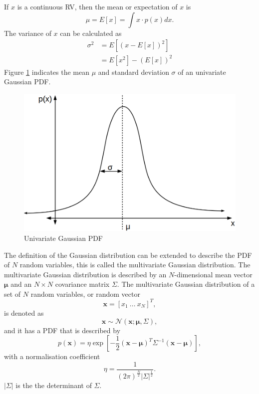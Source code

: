 \documentclass[12pt,oneside,openany,a4paper, %
afrikaans,english,
]{memoir}
\numberwithin{equation}{chapter}
\begin{document}
If $x$ is a continuous RV, then the mean or expectation of $x$ is
\begin{equation}
\mu = E\left[ x \right] = \int x \cdot p(x)dx.
\end{equation}
The variance of $x$ can be calculated as
\begin{equation}
\begin{split}
\sigma^2 & = E\left[\left(x - E[x]\right)^2\right]\\
& = E[x^2] - (E[x])^2
\end{split}
\end{equation}
 Figure \ref{fig:gPDF1} indicates the mean $\mu$ and standard deviation $\sigma$ of an univariate Gaussian PDF.
\begin{figure}[H]
  \includegraphics[width=0.6\linewidth]{Figures/univariate.png}
  \centering
  \caption{Univariate Gaussian PDF}
  \label{fig:gPDF1}
\end{figure}
The definition of the Gaussian distribution can be extended to describe the PDF of $N$ random variables, this is called the multivariate Gaussian distribution. The multivariate Gaussian distribution is described by an $N$-dimensional mean vector $\bm{\mu}$ and an $N\times N$ covariance matrix $\Sigma$. The multivariate Gaussian distribution of a set of $N$ random variables,  or random vector
\begin{equation}
\bm{x} = [x_1\ ...\ x_N]^T,
\end{equation}
is denoted as
\begin{equation}
\bm{x} \sim \mathcal{N}(\bm{x}; \bm{\mu},\Sigma),
\end{equation}
and it has a PDF that is described by
\begin{equation}\label{eq:3}
p(\bm{x})  = \eta\exp\left[-\frac{1}{2}(\bm{x}-\bm{\mu})^T\Sigma^{-1}(\bm{x}-\bm{\mu})\right],
\end{equation}
with a normalisation coefficient
\begin{equation}\label{eq:4}
\eta = \frac{1}{(2\pi)^{\frac{N}{2}}|\Sigma|^{\frac{1}{2}}}.
\end{equation}
$|\Sigma|$ is the the determinant of $\Sigma$.
\end{document}
